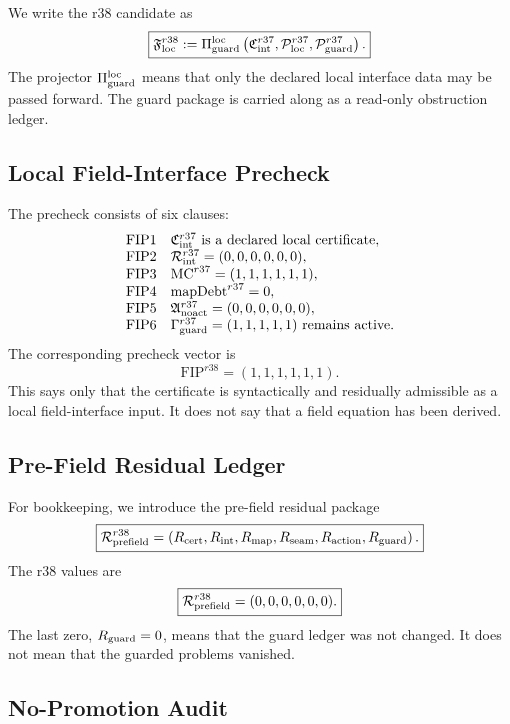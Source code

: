 We write the r38 candidate as
\[
\boxed{
\mathfrak F_{\rm loc}^{r38}
:=
\Pi_{\rm guard}^{\rm loc}
\left(
\mathfrak C_{\rm int}^{r37},
\mathcal P_{\rm loc}^{r37},
\mathcal P_{\rm guard}^{r37}
\right).
}
\]
The projector \(\Pi_{\rm guard}^{\rm loc}\) means that only the declared local
interface data may be passed forward.  The guard package is carried along as a
read-only obstruction ledger.

\subsection{Local Field-Interface Precheck}
\label{subsec:r38-local-field-interface-precheck}

The precheck consists of six clauses:
\[
\begin{array}{ll}
\mathrm{FIP1} & \mathfrak C_{\rm int}^{r37}\hbox{ is a declared local certificate},\\
\mathrm{FIP2} & \mathcal R_{\rm int}^{r37}=(0,0,0,0,0,0),\\
\mathrm{FIP3} & \mathrm{MC}^{r37}=(1,1,1,1,1,1),\\
\mathrm{FIP4} & \mathrm{mapDebt}^{r37}=0,\\
\mathrm{FIP5} & \mathfrak A_{\rm noact}^{r37}=(0,0,0,0,0,0),\\
\mathrm{FIP6} & \Gamma_{\rm guard}^{r37}=(1,1,1,1,1)\hbox{ remains active}.
\end{array}
\]
The corresponding precheck vector is
\[
\boxed{
\mathrm{FIP}^{r38}=(1,1,1,1,1,1).
}
\]
This says only that the certificate is syntactically and residually admissible
as a local field-interface input.  It does not say that a field equation has
been derived.

\subsection{Pre-Field Residual Ledger}
\label{subsec:r38-pre-field-residual-ledger}

For bookkeeping, we introduce the pre-field residual package
\[
\boxed{
\mathcal R_{\rm prefield}^{r38}
=
\left(
R_{\rm cert},R_{\rm int},R_{\rm map},R_{\rm seam},R_{\rm action},R_{\rm guard}
\right).
}
\]
The r38 values are
\[
\boxed{
\mathcal R_{\rm prefield}^{r38}=(0,0,0,0,0,0).
}
\]
The last zero, \(R_{\rm guard}=0\), means that the guard ledger was not changed.
It does not mean that the guarded problems vanished.

\subsection{No-Promotion Audit}
\label{subsec:r38-no-promotion-audit}

